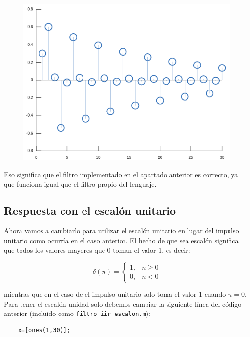 \documentclass[11pt,a4paper]{article}
\begin{document}
\begin{figure}[H]
	\centering
	\includegraphics[scale=0.5]{img/stem-filter.png}
\end{figure}

Eso significa que el filtro implementado en el apartado anterior es correcto, ya que funciona igual que el filtro propio del lenguaje.

\subsection{Respuesta con el escalón unitario}

Ahora vamos a cambiarlo para utilizar el escalón unitario en lugar del impulso unitario como ocurría en el caso anterior. El hecho de que sea escalón significa que todos los valores mayores que 0 toman el valor 1, es decir:

\[\delta(n)=\begin{cases} 
      1, & n\geq 0\\
      0, & n< 0
   \end{cases}
\]

 mientras que en el caso de el impulso unitario solo toma el valor 1 cuando $n=0$.\\
 
Para tener el escalón unidad solo debemos cambiar la siguiente línea del código anterior (incluido como \texttt{filtro\_iir\_escalon.m}):

\begin{lstlisting}[frame=single]
	% Se define el array con los pulsos. El escalon unitario
   	x=[ones(1,30)];
\end{lstlisting}
\end{document}
